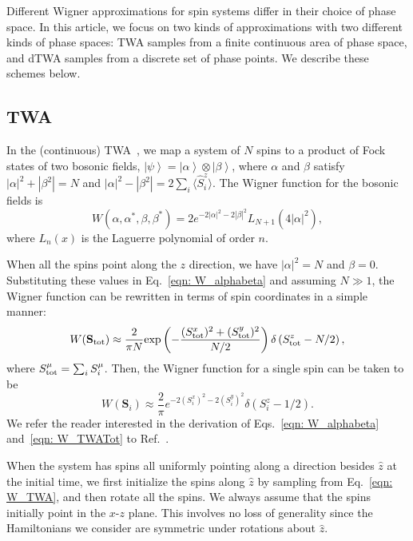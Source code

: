\documentclass[pra,reprint,superscriptaddress]{revtex4-1}
\newcommand{\ket}[1]{\left| #1 \right\rangle}
\newcommand{\smallexpect}[1]{\langle #1 \rangle}
\newcommand{\hS}{\hat{S}}
\begin{document}
Different Wigner approximations for spin systems differ in their choice of phase space. In this article, we focus on two kinds of approximations with two different kinds of phase spaces: TWA samples from a finite continuous area of phase space, and dTWA samples from a discrete set of phase points. We describe these schemes below.

\subsection{TWA}\label{subsec: TWA}
In the (continuous) TWA~\cite{wootters1987wigner, polkovnikov2010phase}, we map a system of $N$ spins to a product of Fock states of two bosonic fields, $\ket{\psi} = \ket{\alpha}\otimes\ket{\beta}$, where $\alpha$ and $\beta$ satisfy $|\alpha|^2+|\beta^2|=N$ and $|\alpha|^2-|\beta^2|=2\sum_i\smallexpect{\hS^z_i}$. The Wigner function for the bosonic fields is 
\begin{equation}
W(\alpha,\alpha^*,\beta,\beta^*) = 2e^{-2|\alpha|^2-2|\beta|^2}L_{N+1}\left(4|\alpha|^2\right), \label{eqn: W_alphabeta}
\end{equation}
where $L_n(x)$ is the Laguerre polynomial of order $n$.

When all the spins point along the $z$ direction, we have $|\alpha|^2=N$ and $\beta=0$. Substituting these values in Eq.~\eqref{eqn: W_alphabeta} and assuming $N\gg1$, the Wigner function can be rewritten in terms of spin coordinates in a simple manner:
\begin{equation}
W(\mathbf{S}_{\rm tot}) \approx \frac{2}{\pi N}{\rm exp}\left(-\frac{(S^x_{\rm tot})^2+(S^y_{\rm tot})^2}{N/2}\right)\delta\left(S^z_{\rm tot}-N/2\right), \label{eqn: W_TWATot}
\end{equation}
where $S^\mu_{\rm tot} = \sum_i S^\mu_i$. Then, the Wigner function for a single spin can be taken to be
\begin{equation}
W(\mathbf{S}_i) \approx \frac{2}{\pi}e^{-2(S^x_i)^2-2(S^y_i)^2}\delta\left(S^z_i-1/2\right). \label{eqn: W_TWA}
\end{equation}
We refer the reader interested in the derivation of Eqs.~\eqref{eqn: W_alphabeta} and~\eqref{eqn: W_TWATot} to Ref.~\cite{polkovnikov2010phase}.

When the system has spins all uniformly pointing along a direction besides $\hat{z}$ at the initial time, we first initialize the spins along $\hat{z}$ by sampling from Eq.~\eqref{eqn: W_TWA}, and then rotate all the spins. We always assume that the spins initially point in the $x$-$z$ plane.
This involves no loss of generality since the Hamiltonians we consider are symmetric under rotations about $\hat z$.
\end{document}
